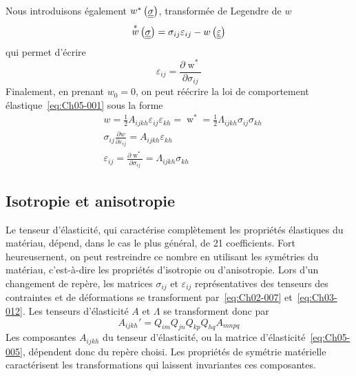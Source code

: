 Nous introduisons également $\mathop{w}^{*}\left( \underline{\underline{\sigma}} \right)$, transformée de Legendre de $w$
\begin{equation}
    \mathop{w}^{*}\left( \underline{\underline{\sigma}} \right) = \sigma_{ij} \varepsilon_{ij} - w \left( \underline{\underline{\varepsilon}} \right)
    \label{eq:Ch05-010}
\end{equation}
qui permet d'écrire
\begin{equation}
    \varepsilon_{ij} = \frac{\partial \mathop{w}^*}{\partial \sigma_{ij}}
    \label{eq:Ch05-011}
\end{equation}
Finalement, en prenant $w_0=0$, on peut réécrire la loi de comportement élastique~\eqref{eq:Ch05-001} sous la forme
\begin{equation}
    \begin{aligned}
        & w = \frac{1}{2} A_{ijkh} \varepsilon_{ij} \varepsilon_{kh} = \mathop{w}^* = \frac{1}{2} \Lambda_{ijkh} \sigma_{ij} \sigma_{kh} \\
        & \sigma_{ij} \frac{\partial w}{\partial \varepsilon_{ij}} = A_{ijkh} \varepsilon_{kh} \\
        & \varepsilon_{ij} = \frac{\partial \mathop{w}^*}{\partial \sigma_{ij}} = \Lambda_{ijkh} \sigma_{kh}
    \end{aligned}
    \label{eq:Ch05-012}
\end{equation}

\subsection{Isotropie et anisotropie} \label{ssec:Ch05-1.2}
Le tenseur d'élasticité, qui caractérise complètement les propriétés élastiques du matériau, dépend, dans le cas le plus général, de 21 coefficients.
Fort heureusernent, on peut restreindre ce nombre en utilisant les symétries du matériau, c'est-à-dire les propriétés d'isotropie ou d'anisotropie.
Lors d'un changement de repère, les matrices $\sigma_{ij}$ et $\varepsilon_{ij}$ représentatives des tenseurs des contraintes et de déformations se transforment par~\eqref{eq:Ch02-007} et~\eqref{eq:Ch03-012}.
Les tenseurs d'élasticité $A$ et $\Lambda$ se transforment donc par
\begin{equation}
    A_{ijkh}' = Q_{im} Q_{jn} Q_{kp} Q_{hq} A_{mnpq}
    \label{eq:Ch05-013}
\end{equation}
Les composantes $A_{ijkh}$ du tenseur d'élasticité, ou la matrice d'élasticité~\eqref{eq:Ch05-005}, dépendent donc du repère choisi.
Les propriétés de symétrie matérielle caractérisent les transformations qui laissent invariantes ces composantes.


